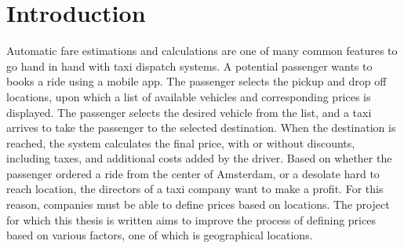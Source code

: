 
\chapter{Introduction}

\ifpdf
    \graphicspath{{Chapter1/Figs/Raster/}{Chapter1/Figs/PDF/}{Chapter1/Figs/}}
\else
    \graphicspath{{Chapter1/Figs/Vector/}{Chapter1/Figs/}}
\fi

Automatic fare estimations and calculations are one of many common features to go hand in hand with taxi dispatch systems. A potential passenger wants to books a ride using a mobile app. The passenger selects the pickup and drop off locations, upon which a list of available vehicles and corresponding prices is displayed. The passenger selects the desired vehicle from the list, and a taxi arrives to take the passenger to the selected destination. When the destination is reached, the system calculates the final price, with or without discounts, including taxes, and additional costs added by the driver. Based on whether the passenger ordered a ride from the center of Amsterdam, or a desolate hard to reach location, the directors of a taxi company want to make a profit. For this reason, companies must be able to define prices based on locations. The project for which this thesis is written aims to improve the process of defining prices based on various factors, one of which is geographical locations.

%
